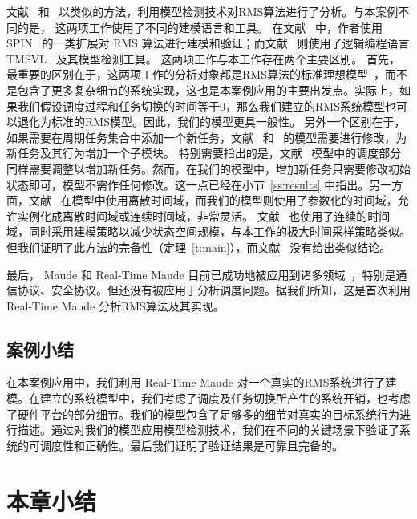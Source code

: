 文献~ 和~ 以类似的方法，利用模型检测技术对RMS算法进行了分析。与本案例不同的是，
这两项工作使用了不同的建模语言和工具。
在文献~ 中，作者使用 SPIN~\cite{DBLP:journals/tse/Holzmann97} 的一类扩展对 RMS 算法进行建模和验证；而文献~ 则使用了逻辑编程语言 TMSVL~\cite{DBLP:conf/icfem/HanDW12} 及其模型检测工具。
这两项工作与本工作存在两个主要区别。
首先，最重要的区别在于，这两项工作的分析对象都是RMS算法的标准理想模型~\cite{DBLP:journals/jacm/LiuL73}，而不是包含了更多复杂细节的系统实现，这也是本案例应用的主要出发点。实际上，如果我们假设调度过程和任务切换的时间等于0，那么我们建立的RMS系统模型也可以退化为标准的RMS模型。因此，我们的模型更具一般性。
另外一个区别在于，如果需要在周期任务集合中添加一个新任务，文献~ 和~ 的模型需要进行修改，为新任务及其行为增加一个子模块。
特别需要指出的是，文献~ 模型中的调度部分同样需要调整以增加新任务。然而，在我们的模型中，增加新任务只需要修改初始状态即可，模型不需作任何修改。这一点已经在小节~\ref{ss:results} 中指出。另一方面，文献~ 在模型中使用离散时间域，而我们的模型则使用了参数化的时间域，允许实例化成离散时间域或连续时间域，非常灵活。 文献~ 也使用了连续的时间域，同时采用建模策略以减少状态空间规模，与本工作的极大时间采样策略类似。但我们证明了此方法的完备性（定理~\ref{t:main}），而文献~ 没有给出类似结论。

最后， Maude 和 Real-Time Maude 目前已成功地被应用到诸多领域~\cite{DBLP:journals/jlp/Meseguer12}，特别是通信协议、安全协议。但还没有被应用于分析调度问题。据我们所知，这是首次利用 Real-Time Maude 分析RMS算法及其实现。


\subsection{案例小结}
\label{s:conclusion}
在本案例应用中，我们利用 Real-Time Maude 对一个真实的RMS系统进行了建模。在建立的系统模型中，我们考虑了调度及任务切换所产生的系统开销，也考虑了硬件平台的部分细节。我们的模型包含了足够多的细节对真实的目标系统行为进行描述。通过对我们的模型应用模型检测技术，我们在不同的关键场景下验证了系统的可调度性和正确性。最后我们证明了验证结果是可靠且完备的。 


\section{本章小结}

